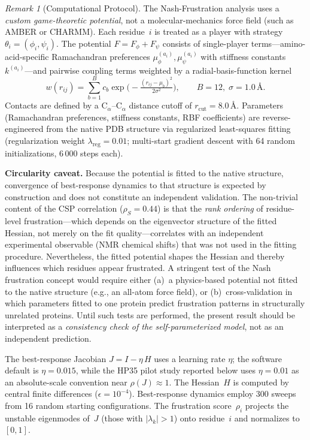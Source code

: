 \documentclass[12pt,a4paper]{article}
\theoremstyle{remark}
\newtheorem{remark}{Remark}
\begin{document}
\begin{remark}[Computational Protocol]\label{rem:comp-protocol}
The Nash-Frustration analysis uses a \emph{custom game-theoretic potential}, not a molecular-mechanics force field (such as AMBER or CHARMM).
Each residue~$i$ is treated as a player with strategy $\theta_i = (\phi_i, \psi_i)$.
The potential $F = F_\phi + F_\psi$ consists of single-player terms---amino-acid-specific Ramachandran preferences $\mu_\phi^{(a_i)}, \mu_\psi^{(a_i)}$ with stiffness constants~$k^{(a_i)}$---and pairwise coupling terms weighted by a radial-basis-function kernel
\[
  w(r_{ij}) = \sum_{b=1}^{B} c_b \exp\!\bigl(-\tfrac{(r_{ij}-\mu_b)^2}{2\sigma^2}\bigr),
  \qquad B=12,\; \sigma = 1.0\,\text{\AA}.
\]
Contacts are defined by a C$_\alpha$--C$_\alpha$ distance cutoff of $r_\text{cut} = 8.0$\,\AA.
Parameters (Ramachandran preferences, stiffness constants, RBF coefficients) are reverse-engineered from the native PDB structure via regularized least-squares fitting (regularization weight $\lambda_{\text{reg}} = 0.01$; multi-start gradient descent with 64 random initializations, 6\,000 steps each).

\textbf{Circularity caveat.} Because the potential is fitted to the native structure, convergence of best-response dynamics to that structure is expected by construction and does not constitute an independent validation. The non-trivial content of the CSP correlation ($\rho_S = 0.44$) is that the \emph{rank ordering} of residue-level frustration---which depends on the eigenvector structure of the fitted Hessian, not merely on the fit quality---correlates with an independent experimental observable (NMR chemical shifts) that was not used in the fitting procedure. Nevertheless, the fitted potential shapes the Hessian and thereby influences which residues appear frustrated. A stringent test of the Nash frustration concept would require either (a)~a physics-based potential not fitted to the native structure (e.g., an all-atom force field), or (b)~cross-validation in which parameters fitted to one protein predict frustration patterns in structurally unrelated proteins. Until such tests are performed, the present result should be interpreted as a \emph{consistency check of the self-parameterized model}, not as an independent prediction.

The best-response Jacobian $J = I - \eta\, H$ uses a learning rate $\eta$; the software default is $\eta = 0.015$, while the HP35 pilot study reported below uses $\eta = 0.01$ as an absolute-scale convention near $\rho(J) \approx 1$. The Hessian~$H$ is computed by central finite differences ($\epsilon = 10^{-4}$).
Best-response dynamics employ 300 sweeps from 16 random starting configurations.
The frustration score~$\rho_i$ projects the unstable eigenmodes of~$J$ (those with $|\lambda_k| > 1$) onto residue~$i$ and normalizes to $[0,1]$.


\end{remark}
\end{document}
